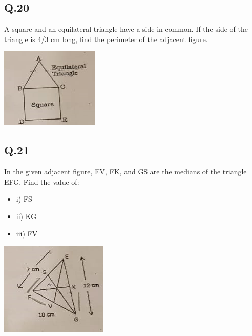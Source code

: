 \documentclass[11pt]{article}
\begin{document}
\subsection*{Q.20}
\label{sec:org477506b}
A square and an equilateral triangle have a side in common. If the side of the triangle is 4/3 cm long, find the perimeter of the adjacent figure.
\begin{center}
\includegraphics[width=.9\linewidth]{./maths20.png}
\end{center}
\subsection*{Q.21}
\label{sec:org1f95087}
In the given adjacent figure, EV, FK, and GS are the medians of the triangle EFG. Find the value of:
\begin{itemize}
\item i) FS
\item ii) KG
\item iii) FV
\end{itemize}
\begin{center}
\includegraphics[width=.9\linewidth]{./maths21.png}
\end{center}
\end{document}
